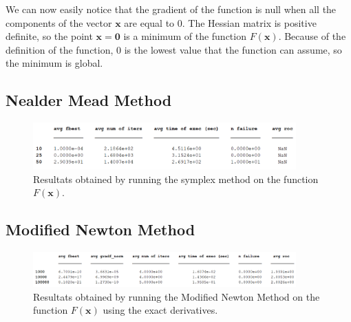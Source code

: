 We can now easily notice that the gradient of the function is null when all the components of the vector $\mathbf{x}$ are equal to 0. The Hessian matrix is positive definite, so the point $\mathbf{x} = \mathbf{0}$ is a minimum of the function $F(\mathbf{x})$. 
Because of the definition of the function, $0$ is the lowest value that the function can assume, so the minimum is global.


\subsection*{Nealder Mead Method}

\begin{figure}[htbp]
    \centering
    \includegraphics[width = 0.9\textwidth]{img/pb76_table_SX.png}
    \caption{Resultats obtained by running the symplex method on the function $F(\mathbf{x})$.}
\end{figure}


\subsection*{Modified Newton Method}


\begin{figure}[htbp]
    \centering
    \includegraphics[width = 0.9\textwidth]{img/pb76_table_MN.png}
    \caption{Resultats obtained by running the Modified Newton Method on the function $F(\mathbf{x})$ using the exact derivatives.}
\end{figure}